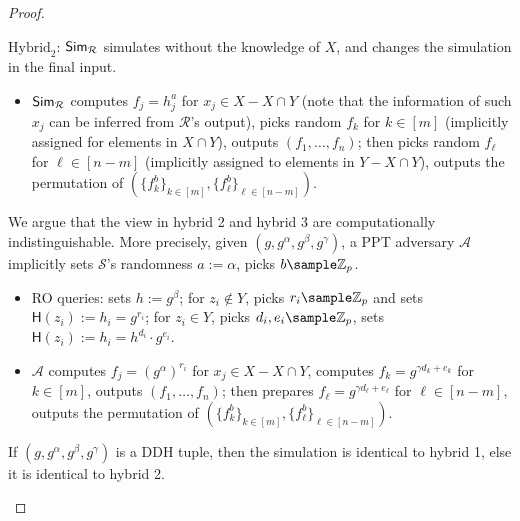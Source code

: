 \begin{proof}
\begin{trivlist}
\item $\text{Hybrid}_2$: $\mathsf{Sim}_\mathcal{R}$ simulates without the knowledge of $X$, 
    and changes the simulation in the final input.  
\begin{itemize}
    \item $\mathsf{Sim}_\mathcal{R}$ computes $f_j = h_j^{a}$ for $x_j \in X - X \cap Y$ (note that the information of such $x_j$ 
        can be inferred from $\mathcal{R}$'s output), picks random $f_k$ for $k \in [m]$ 
        (implicitly assigned for elements in $X \cap Y$), outputs $(f_1, \dots, f_n)$; 
        then picks random $f_\ell$ for $\ell \in [n-m]$ (implicitly assigned to elements in $Y - X \cap Y$), 
        outputs the permutation of $(\{f_k^b\}_{k \in [m]}, \{f_\ell^b\}_{\ell \in [n-m]})$.        
\end{itemize}
We argue that the view in hybrid 2 and hybrid 3 are computationally indistinguishable. 
More precisely, given $(g, g^\alpha, g^\beta, g^\gamma)$, 
a PPT adversary $\mathcal{A}$  
implicitly sets $\mathcal{S}$'s randomness $a:=\alpha$, picks $b \sample \mathbb{Z}_p$. 
\begin{itemize}
    \item RO queries: sets $h := g^\beta$; 
        for $z_i \notin Y$, picks $r_i \sample \mathbb{Z}_p$ and sets $\mathsf{H}(z_i):= h_i = g^{r_i}$; 
        for $z_i \in Y$, 
        picks $d_i, e_i \sample \mathbb{Z}_p$, sets $\mathsf{H}(z_i):= h_i = h^{d_i} \cdot g^{e_i}$.  

    \item $\mathcal{A}$ computes $f_j = (g^\alpha)^{r_i}$ for $x_j \in X - X \cap Y$, 
        computes $f_k = g^{\gamma d_k + e_k}$ for $k \in [m]$, outputs $(f_1, \dots, f_n)$; 
        then prepares $f_\ell = g^{\gamma d_\ell + e_\ell}$ for $\ell \in [n-m]$, 
        outputs the permutation of $(\{f_k^b\}_{k \in [m]}, \{f_\ell^b\}_{\ell \in [n-m]})$.          
\end{itemize}

If $(g, g^\alpha, g^\beta, g^\gamma)$ is a DDH tuple, then the simulation is identical to hybrid 1, 
else it is identical to hybrid 2. 
\end{trivlist}
\end{proof}
